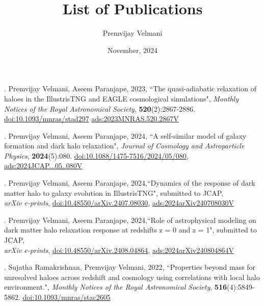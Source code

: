 \documentclass[12pt]{article}
\title{List of Publications}
\author{Premvijay Velmani}
\date{November, 2024}
\newcommand{\doi}[1]{\href{https://doi.org/#1}{doi:#1}}
\begin{document}
\maketitle


. Premvijay Velmani, Aseem Paranjape, 2023, ``The quasi-adiabatic relaxation of haloes in the IllustrisTNG and EAGLE cosmological simulations", \textit{Monthly Notices of the Royal Astronomical Society}, 
\textbf{520}(2):2867-2886. 
\doi{10.1093/mnras/stad297}
\href{https://ui.adsabs.harvard.edu/abs/2023MNRAS.520.2867V}{ads:2023MNRAS.520.2867V}


\vspace{0.5cm}

. Premvijay Velmani, Aseem Paranjape, 2024, ``A self-similar model of galaxy formation and dark halo relaxation", \textit{Journal of Cosmology and Astroparticle Physics}, 
\textbf{2024}(5):080. 
\doi{10.1088/1475-7516/2024/05/080},
\href{https://ui.adsabs.harvard.edu/abs/2024JCAP...05..080V}{ads:2024JCAP...05..080V}

\vspace{0.5cm}

. Premvijay Velmani, Aseem Paranjape, 2024,``Dynamics of the response of dark matter halo to galaxy evolution in IllustrisTNG", submitted to JCAP, \\ \textit{arXiv e-prints},
\doi{10.48550/arXiv.2407.08030}, 
\href{https://ui.adsabs.harvard.edu/abs/2024arXiv240708030V}{ads:2024arXiv240708030V}

\vspace{0.5cm}

. Premvijay Velmani, Aseem Paranjape, 2024,``Role of astrophysical modeling on dark matter halo relaxation response at redshifts z = 0 and z = 1", submitted to JCAP, \\ \textit{arXiv e-prints},
\doi{10.48550/arXiv.2408.04864}, 
\href{https://ui.adsabs.harvard.edu/abs/2024arXiv240804864V}{ads:2024arXiv240804864V}

\vspace{0.5cm}

. Sujatha Ramakrishnan, Premvijay Velmani, 2022, ``Properties beyond mass
for unresolved haloes across redshift and cosmology using correlations with local halo environment.", \textit{Monthly Notices of the Royal Astronomical Society}, 
\textbf{516}(4):5849-5862. 
\doi{10.1093/mnras/stac2605}
\end{document}
